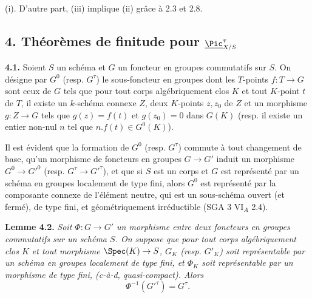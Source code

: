
(i). D'autre part, (iii) implique (ii) gr\^ace \`a 2.3 et 2.8.

\subsection*{4. Th\'eor\`emes de finitude pour $\underline{\Pic}^\tau_{X/S}$}

\textbf{4.1.} Soient \(S\) un sch\'ema et \(G\) un foncteur en groupes commutatifs sur \(S\). On d\'esigne par \(G^0\) (resp. \(G^\tau\)) le sous-foncteur en groupes dont les \(T\)-points \(f:T\to G\) sont ceux de \(G\) tels que pour tout corps alg\'ebriquement clos \(K\) et tout \(K\)-point \(t\) de \(T\), il existe un \(k\)-sch\'ema connexe \(Z\), deux \(K\)-points \(z,z_0\) de \(Z\) et un morphisme \(g:Z\to G\) tels que \(g(z)=f(t)\) et \(g(z_0)=0\) dans \(G(K)\) (resp. il existe un entier non-nul \(n\) tel que \(n.f(t)\in G^0(K)\)).

Il est \'evident que la formation de \(G^0\) (resp. \(G^\tau\)) commute \`a tout changement de base, qu'un morphisme de foncteurs en groupes \(G\to G'\) induit un morphisme \(G^0\to G'^0\) (resp. \(G^\tau\to G'^\tau\)), et que si \(S\) est un corps et \(G\) est repr\'esent\'e par un sch\'ema en groupes localement de type fini, alors \(G^0\) est repr\'esent\'e par la composante connexe de l'\'el\'ement neutre, qui est un sous-sch\'ema ouvert (et ferm\'e), de type fini, et g\'eom\'etriquement irr\'eductible (SGA 3 VI\(_A\) 2.4).

\textbf{Lemme 4.2.} \emph{Soit \(\Phi:G\to G'\) un morphisme entre deux foncteurs en groupes commutatifs sur un sch\'ema \(S\). On suppose que pour tout corps alg\'ebriquement clos \(K\) et tout morphisme \(\Spec(K)\to S\), \(G_K\) (resp. \(G'_K\)) soit repr\'esentable par un sch\'ema en groupes localement de type fini, et \(\Phi_K\) soit repr\'esentable par un morphisme de type fini, (c-\`a-d, quasi-compact). Alors}
\[
  \Phi^{-1}(G'^\tau)=G^\tau.
\]

